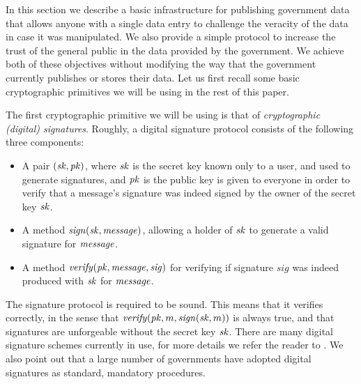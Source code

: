 
In this section we describe a basic infrastructure for publishing government data that allows anyone with a single data entry to challenge the veracity of the data in case it was manipulated. We also provide a simple protocol to increase the trust of the general public in the data provided by the government. We achieve both of these objectives without modifying the way that the government currently publishes or stores their data. Let us first recall some basic cryptographic primitives we will be using in the rest of this paper.

\medskip
{} The first cryptographic primitive we will be using is that of {\em cryptographic (digital) signatures}. Roughly, a digital signature protocol consists of the following three components:
\begin{itemize}
\item A pair $(\mathit{sk},\mathit{pk})$, where $\mathit{sk}$ is the secret key known only to a user, and used to generate signatures, and $\mathit{pk}$ is the public key is given to everyone in order to verify that a message's signature was indeed signed by the owner of the secret key $\mathit{sk}$.
\item A method $\mathit{sign}(\mathit{sk},\mathit{message})$, allowing a holder of $\mathit{sk}$ to generate a valid signature for $\mathit{message}$. 
\item A method $\mathit{verify}(\mathit{pk},\mathit{message},\mathit{sig})$ for verifying if signature $\mathit{sig}$ was indeed produced with $\mathit{sk}$ for $\mathit{message}$.
\end{itemize}
The signature protocol is required to be sound. This means that it verifies correctly, in the sense that $\mathit{verify}(\mathit{pk},m,\mathit{sign}(\mathit{sk},m))$ is always true, and that signatures are unforgeable without the secret key $\mathit{sk}$. There are many digital signature schemes currently in use, for more details we refer the reader to \cite{KatzLindell2014}. We also point out that a large number of governments have adopted digital signatures as standard, mandatory procedures.

